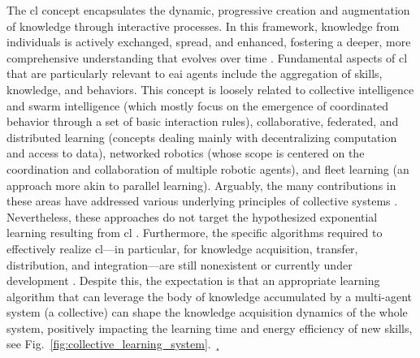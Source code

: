 \documentclass[12pt]{article}
\begin{document}
The \ac{cl} concept encapsulates the dynamic, progressive creation and augmentation of knowledge through interactive processes. In this framework, knowledge from individuals is actively exchanged, spread, and enhanced, fostering a deeper, more comprehensive understanding that evolves over time \cite{Garavan2012CollectiveLearning}. Fundamental aspects of \ac{cl} that are particularly relevant to \ac{eai} agents include the aggregation of skills, knowledge, and behaviors. This concept is loosely related to collective intelligence and swarm intelligence \cite{Beni2004SwarmIntelligenceSwarm,Blum2015SwarmIntelligenceOptimization,Dorigo2021SwarmRoboticsPast} (which mostly focus on the emergence of coordinated behavior through a set of basic interaction rules), collaborative, federated, and distributed learning \cite{Technologie2023FLAIROPFederatedLearning,Anjos2023SurveyCollaborativeLearning,Xianjia2021Federatedlearningrobotic,Sartoretti2019DistributedLearningDecentralized,Sartoretti2018DistributedLearningDecentralized,Wang2022DistributedReinforcementLearning} (concepts dealing mainly with decentralizing computation and access to data), networked robotics \cite{Kumar2008NetworkedRobots} (whose scope is centered on the coordination and collaboration of multiple robotic agents), and fleet learning \cite{Wang2023RobotFleetLearning} (an approach more akin to parallel learning). Arguably, the many contributions in these areas have addressed various underlying principles of collective systems \cite{Kernbach2013HandbookCollectiveRobotics}.
Nevertheless, these approaches do not target the hypothesized exponential learning resulting from \ac{cl} \cite{Haddadin2019Breakingwallcollective}. Furthermore, the specific algorithms required to effectively realize \ac{cl}---in particular, for knowledge acquisition, transfer,  distribution, and integration---are still nonexistent or currently under development \cite{Haddadin2022collectivelearningtheory}. Despite this, the expectation is that an appropriate learning algorithm that can leverage the body of knowledge accumulated by a multi-agent system (a collective) can shape the knowledge acquisition dynamics of the whole system, positively impacting the learning time and energy efficiency of new skills, see Fig.~\ref{fig:collective_learning_system}.
¸
\end{document}
